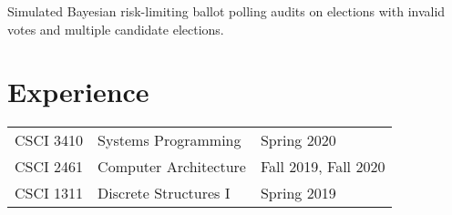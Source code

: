 \documentclass[]{deedy-resume-openfont}
\begin{document}
\begin{minipage}[t]{0.66\textwidth}
        \sectionsep
        Simulated Bayesian risk-limiting ballot polling audits on elections with invalid votes and multiple candidate elections.


        \section{Experience}
        \vspace{\topsep} %
        \begin{tabular}{rll}
                CSCI 3410 & Systems Programming   & Spring 2020\\
                CSCI 2461 & Computer Architecture & Fall 2019, Fall 2020\\
                CSCI 1311 & Discrete Structures I & Spring 2019 \\
        \end{tabular}
        \sectionsep



\end{minipage}
\end{document}

